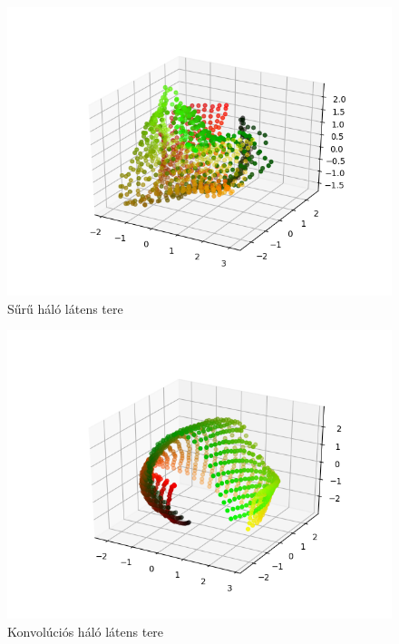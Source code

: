 \begin{figure}[h!]
\begin{center}
  
  \includegraphics[width=\linewidth]{metrics/3D-dense.png}
  \caption{Sűrű háló látens tere}\label{3D-dense}
\end{center}
\end{figure}

\begin{figure}[h!]
\begin{center}
  
  \includegraphics[width=\linewidth]{metrics/3D-epoch18.png}
  \caption{Konvolúciós háló látens tere}\label{3D-conv}
\end{center}
\end{figure}

